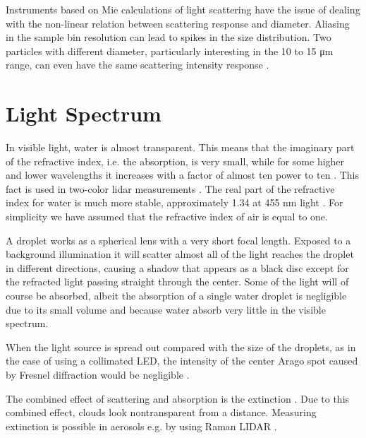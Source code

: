 Instruments based on Mie calculations of light scattering have the issue of dealing with the non-linear relation between scattering response and diameter. Aliasing in the sample bin resolution can lead to spikes in the size distribution. Two particles with different diameter, particularly interesting in the 10 to 15 μm range, can even have the same scattering intensity response \cite{dye1984,spie2012,bohr2008}.

\section{Light Spectrum}

In visible light, water is almost transparent. This means that the imaginary part of the refractive index, i.e. the absorption, is very small, while for some higher and lower wavelengths it increases with a factor of almost ten power to ten \cite{kou1993}. This fact is used in two-color lidar measurements \cite{west2010}. The real part of the refractive index for water is much more stable, approximately 1.34 at 455 nm light \cite{hale1973}. For simplicity we have assumed that the refractive index of air is equal to one. 

A droplet works as a spherical lens with a very short focal length. Exposed to a background illumination it will scatter almost all of the light reaches the droplet in different directions, causing a shadow that appears as a black disc except for the refracted light passing straight through the center. Some of the light will of course be absorbed, albeit the absorption of a single water droplet is negligible due to its small volume and because water absorb very little in the visible spectrum.

When the light source is spread out compared with the size of the droplets, as in the case of using a collimated LED, the intensity of the center Arago spot caused by Fresnel diffraction would be negligible \cite{reis2017}.

The combined effect of scattering and absorption is the extinction \cite{bohr2008}. Due to this combined effect, clouds look nontransparent from a distance. Measuring extinction is possible in aerosols e.g. by using Raman LIDAR \cite{ans1990}.

